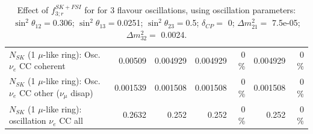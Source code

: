 \begin{table}
\begin{tabular}{| l | r | r | r  r | r  r |}
                          $N_{SK}$ (1 $\mu$-like ring): Osc. $\nu_e$ CC coherent &         0.00509 &        0.004929 &        0.004929 &        0 \%  &        0.004929 &        0 \%  \\ 
           $N_{SK}$ (1 $\mu$-like ring): Osc. $\nu_e$ CC other ($\nu_\mu$ disap) &        0.001539 &        0.001508 &        0.001508 &        0 \%  &        0.001508 &        0 \%  \\ 
                        $N_{SK}$ (1 $\mu$-like ring): oscillation $\nu_e$ CC all &          0.2632 &           0.252 &           0.252 &        0 \%  &           0.252 &        0 \%  \\ 
\hline
\hline
\end{tabular}
\caption{ Effect of $f_{3; r}^{SK+FSI}$ for for 3 flavour oscillations, using oscillation parameters:  $\sin^2\theta_{12} = $0.306; $\sin^2\theta_{13} = $0.0251; $\sin^2\theta_{23} = $0.5; $\delta_{CP} = $        0; $\Delta m^2_{21} = $    7.5e-05; $\Delta m^2_{32} = $    0.0024. }
\label{tab:num_skdetfsi_003_1RmuT_3f_osc_t13:0.0251_spectralreco_spectraltrue}
\end{table}
\clearpage
